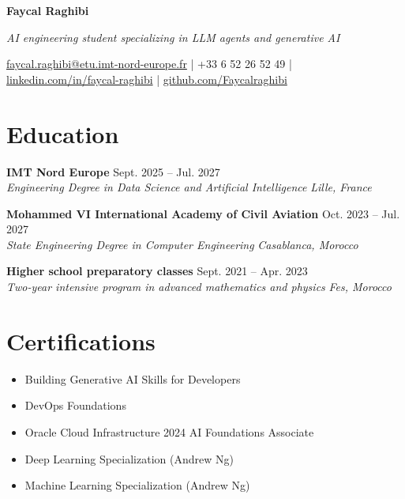 \documentclass[11pt,a4paper]{article}
\newcommand{\resumeSubheading}[4]{
  \vspace{3pt}
  \noindent\textbf{#1} \hfill #2 \\
  \textit{#3} \hfill \textit{#4}
  \vspace{2pt}
}
\begin{document}
\begin{center}
{\LARGE \textbf{Faycal Raghibi}}

\vspace{2pt}
{\small\textit{AI engineering student specializing in LLM agents and generative AI}}

\vspace{2pt}
\href{mailto:faycal.raghibi@etu.imt-nord-europe.fr}{faycal.raghibi@etu.imt-nord-europe.fr} | +33 6 52 26 52 49 | \href{https://linkedin.com/in/faycal-raghibi}{linkedin.com/in/faycal-raghibi} | \href{https://github.com/Faycalraghibi}{github.com/Faycalraghibi}
\end{center}

\section{Education}
\resumeSubheading{IMT Nord Europe}{Sept. 2025 -- Jul. 2027}{Engineering Degree in Data Science and Artificial Intelligence}{Lille, France}
\resumeSubheading{Mohammed VI International Academy of Civil Aviation}{Oct. 2023 -- Jul. 2027}{State Engineering Degree in Computer Engineering}{Casablanca, Morocco}
\resumeSubheading{Higher school preparatory classes}{Sept. 2021 -- Apr. 2023}{Two-year intensive program in advanced mathematics and physics}{Fes, Morocco}

\section{Certifications}
\begin{itemize}
  \item Building Generative AI Skills for Developers
  \item DevOps Foundations
  \item Oracle Cloud Infrastructure 2024 AI Foundations Associate
  \item Deep Learning Specialization (Andrew Ng)
  \item Machine Learning Specialization (Andrew Ng)
\end{itemize}
\end{document}
